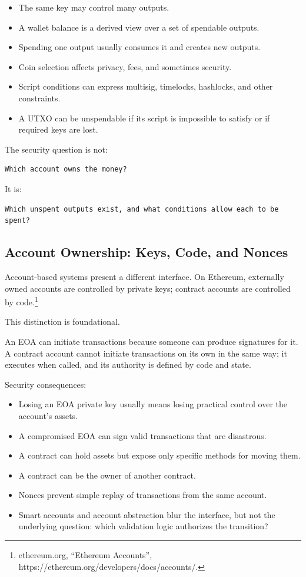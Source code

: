 \begin{itemize}
\tightlist
\item
  The same key may control many outputs.
\item
  A wallet balance is a derived view over a set of spendable outputs.
\item
  Spending one output usually consumes it and creates new outputs.
\item
  Coin selection affects privacy, fees, and sometimes security.
\item
  Script conditions can express multisig, timelocks, hashlocks, and
  other constraints.
\item
  A UTXO can be unspendable if its script is impossible to satisfy or if
  required keys are lost.
\end{itemize}

The security question is not:

\begin{lstlisting}
Which account owns the money?
\end{lstlisting}

It is:

\begin{lstlisting}
Which unspent outputs exist, and what conditions allow each to be spent?
\end{lstlisting}

\subsection{Account Ownership: Keys, Code, and Nonces}

Account-based systems present a different interface. On Ethereum,
externally owned accounts are controlled by private keys; contract
accounts are controlled by code.\footnote{ethereum.org, ``Ethereum
  Accounts'', https://ethereum.org/developers/docs/accounts/.}

This distinction is foundational.

An EOA can initiate transactions because someone can produce signatures
for it. A contract account cannot initiate transactions on its own in
the same way; it executes when called, and its authority is defined by
code and state.

Security consequences:

\begin{itemize}
\tightlist
\item
  Losing an EOA private key usually means losing practical control over
  the account's assets.
\item
  A compromised EOA can sign valid transactions that are disastrous.
\item
  A contract can hold assets but expose only specific methods for moving
  them.
\item
  A contract can be the owner of another contract.
\item
  Nonces prevent simple replay of transactions from the same account.
\item
  Smart accounts and account abstraction blur the interface, but not the
  underlying question: which validation logic authorizes the transition?
\end{itemize}

